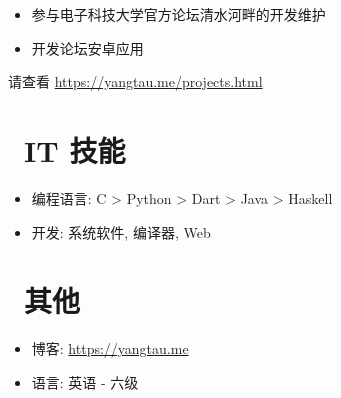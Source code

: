 \documentclass{resume}
\begin{document}
\begin{onehalfspacing}
\begin{itemize}
  \item 参与电子科技大学官方论坛清水河畔的开发维护
  \item 开发论坛安卓应用
\end{itemize}
\end{onehalfspacing}


\begin{onehalfspacing}
请查看 \url{https://yangtau.me/projects.html}
\end{onehalfspacing}


\section{\faCogs\ IT 技能}
\begin{itemize}[parsep=0.5ex]
  \item 编程语言: C > Python > Dart > Java > Haskell
  \item 开发: 系统软件, 编译器, Web
\end{itemize}

\section{\faInfo\ 其他}
\begin{itemize}[parsep=0.5ex]
  \item 博客: \url{https://yangtau.me}
  \item 语言: 英语 - 六级
\end{itemize}

%
%
\end{document}
